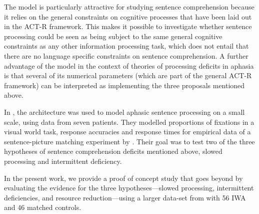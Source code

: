 \documentclass[10pt,letterpaper]{article}
\begin{document}
The  model is particularly attractive for studying sentence comprehension because it relies on the general constraints on cognitive processes that have been laid out in the ACT-R framework. This makes it possible to investigate whether sentence processing could be seen as being subject to the same general cognitive constraints as  any other information processing task, which does not entail that there are no language specific constraints on sentence comprehension.
A further advantage of the  model in the context of theories of processing deficits in aphasia is that several of its numerical parameters (which are part of the general ACT-R framework) can be interpreted as  implementing the three proposals mentioned above.

In , the  architecture was used to model aphasic sentence processing on a small scale, using data from seven patients. 
They modelled proportions of fixations in a visual world task, response accuracies and response times for empirical data of a sentence-picture matching experiment by . Their goal was to test two of the three hypotheses of sentence comprehension deficits mentioned above, slowed processing and intermittent deficiency.  

In the present work, we provide a proof of concept study that goes beyond  by evaluating the evidence for the three hypotheses---slowed processing, intermittent deficiencies, and resource reduction---using a larger data-set from  with 56 IWA and 46 matched controls.
\end{document}
